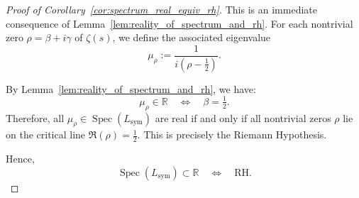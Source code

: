 \begin{proof}[Proof of Corollary~\ref{cor:spectrum_real_equiv_rh}]
This is an immediate consequence of Lemma~\ref{lem:reality_of_spectrum_and_rh}. For each nontrivial zero \( \rho = \beta + i\gamma \) of \( \zeta(s) \), we define the associated eigenvalue
\[
\mu_\rho := \frac{1}{i(\rho - \tfrac{1}{2})}.
\]

By Lemma~\ref{lem:reality_of_spectrum_and_rh}, we have:
\[
\mu_\rho \in \mathbb{R} \quad \Longleftrightarrow \quad \beta = \tfrac{1}{2}.
\]
Therefore, all \( \mu_\rho \in \operatorname{Spec}(L_{\mathrm{sym}}) \) are real if and only if all nontrivial zeros \( \rho \) lie on the critical line \( \Re(\rho) = \tfrac{1}{2} \). This is precisely the Riemann Hypothesis.

Hence,
\[
\operatorname{Spec}(L_{\mathrm{sym}}) \subset \mathbb{R} \quad \iff \quad \mathrm{RH}.
\]
\end{proof}
% 